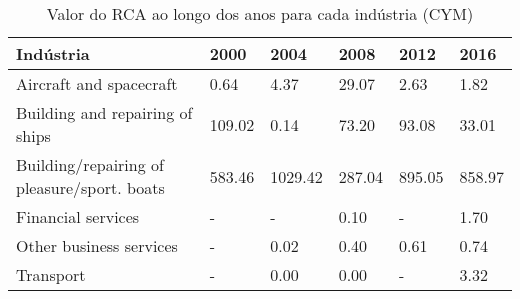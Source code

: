 \begin{table}
\centering
\caption{Valor do RCA ao longo dos anos para cada indústria (CYM)}
\begin{tabular}{p{6cm}p{1.5cm}p{1.5cm}p{1.5cm}p{1.5cm}p{1.5cm}}
\toprule
                                  Indústria &   2000 &    2004 &   2008 &   2012 &   2016 \\
\midrule
                    Aircraft and spacecraft &   0.64 &    4.37 &  29.07 &   2.63 &   1.82 \\
            Building and repairing of ships & 109.02 &    0.14 &  73.20 &  93.08 &  33.01 \\
Building/repairing of pleasure/sport. boats & 583.46 & 1029.42 & 287.04 & 895.05 & 858.97 \\
                         Financial services &      - &       - &   0.10 &      - &   1.70 \\
                    Other business services &      - &    0.02 &   0.40 &   0.61 &   0.74 \\
                                  Transport &      - &    0.00 &   0.00 &      - &   3.32 \\
\bottomrule
\end{tabular}
\end{table}
